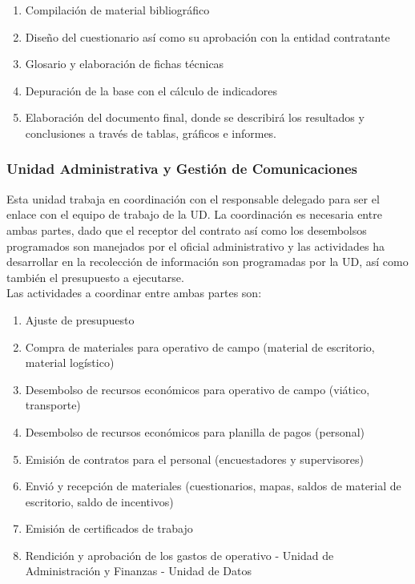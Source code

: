 \documentclass{article}
\begin{document}
\begin{enumerate}
\item Compilación de material bibliográfico
\item Diseño del cuestionario así como su aprobación con la entidad contratante
\item Glosario y elaboración de fichas técnicas
\item Depuración de la base con el cálculo de indicadores
\item Elaboración del documento final, donde se describirá los resultados y conclusiones a través de tablas, gráficos e informes.
\end{enumerate}

\subsubsection{Unidad Administrativa y Gestión de Comunicaciones}

Esta unidad trabaja en coordinación con el responsable delegado para ser el enlace con el equipo de trabajo de la UD. La coordinación es necesaria entre ambas partes, dado que el receptor del contrato así como los desembolsos programados son manejados por el oficial administrativo y las actividades ha desarrollar en la recolección de información son programadas por la UD, así como también el presupuesto a ejecutarse.\\

Las actividades a coordinar entre ambas partes son:

\begin{enumerate}
\item Ajuste de presupuesto 
\item Compra de materiales para operativo de campo (material de escritorio, material logístico)
\item Desembolso de recursos económicos para operativo de campo (viático, transporte)
\item Desembolso de recursos económicos para planilla de pagos (personal)
\item Emisión de contratos para el personal (encuestadores y supervisores) 
\item Envió y recepción de materiales (cuestionarios, mapas, saldos de material de escritorio, saldo de incentivos)
\item Emisión de certificados de trabajo
\item Rendición y aprobación de los gastos de operativo - Unidad de Administración y Finanzas - Unidad de Datos
\end{enumerate}
\end{document}
